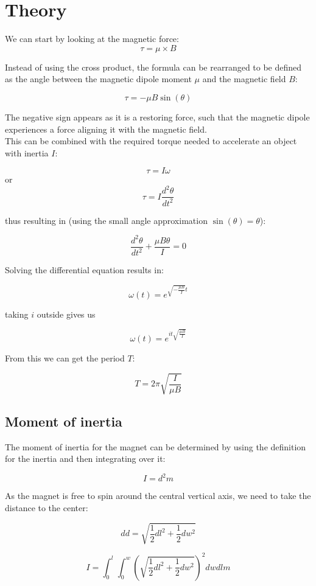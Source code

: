 \documentclass[14pt]{article}
\begin{document}
\section{Theory}

We can start by looking at
the magnetic force: 
$$
\tau = \mu \times B
$$

Instead of using the cross product, the formula can be rearranged to be defined as the angle between the magnetic dipole moment
$\mu$ and the magnetic field $B$: 

$$
\tau = -\mu B \sin(\theta)
$$

The negative sign appears as it is a restoring force, such that the magnetic dipole experiences a force aligning it
with the magnetic field.\\

This can be combined with the required torque needed to accelerate an object with inertia $I$:

$$
\tau = I\omega
$$
or
$$
\tau = I\frac{d^2\theta}{dt^2}
$$

thus resulting in (using the small angle approximation $\sin(\theta)=\theta$):

$$
\frac{d^2\theta}{dt^2} + \frac{\mu B \theta}{I} = 0
$$

Solving the differential equation results in:

$$
\omega(t) = e^{\sqrt{-\frac{\mu B}{I}} t}
$$

taking $i$ outside gives us

$$
\omega(t) = e^{i t \sqrt{\frac{\mu B}{I}} }
$$

From this we can get the period $T$:

$$
T = 2 \pi \sqrt{\frac{I}{\mu B}}
$$

\subsection{Moment of inertia}

The moment of inertia for the magnet can be determined by using the definition for the inertia and then
integrating over it:

$$
I = d^2 m
$$

As the magnet is free to spin around the central vertical axis, we need to take the distance to the center:

$$
dd = \sqrt{\frac{1}{2} dl^2 + \frac{1}{2} dw^2}
$$

$$
I = \int_0^l{\int_0^w{(\sqrt{\frac{1}{2} dl^2 + \frac{1}{2} dw^2})^2}}dw dl m
$$
\end{document}
